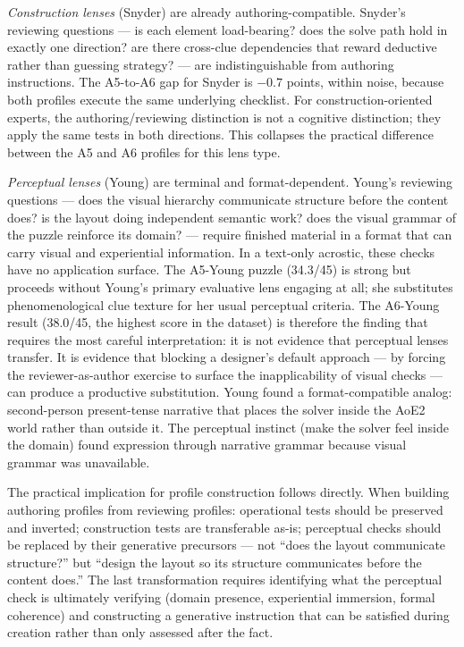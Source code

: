 \textit{Construction lenses} (Snyder) are already authoring-compatible. Snyder's reviewing questions — is each element load-bearing? does the solve path hold in exactly one direction? are there cross-clue dependencies that reward deductive rather than guessing strategy? — are indistinguishable from authoring instructions. The A5-to-A6 gap for Snyder is $-0.7$ points, within noise, because both profiles execute the same underlying checklist. For construction-oriented experts, the authoring/reviewing distinction is not a cognitive distinction; they apply the same tests in both directions. This collapses the practical difference between the A5 and A6 profiles for this lens type.

\textit{Perceptual lenses} (Young) are terminal and format-dependent. Young's reviewing questions — does the visual hierarchy communicate structure before the content does? is the layout doing independent semantic work? does the visual grammar of the puzzle reinforce its domain? — require finished material in a format that can carry visual and experiential information. In a text-only acrostic, these checks have no application surface. The A5-Young puzzle (34.3/45) is strong but proceeds without Young's primary evaluative lens engaging at all; she substitutes phenomenological clue texture for her usual perceptual criteria. The A6-Young result (38.0/45, the highest score in the dataset) is therefore the finding that requires the most careful interpretation: it is not evidence that perceptual lenses transfer. It is evidence that blocking a designer's default approach — by forcing the reviewer-as-author exercise to surface the inapplicability of visual checks — can produce a productive substitution. Young found a format-compatible analog: second-person present-tense narrative that places the solver inside the AoE2 world rather than outside it. The perceptual instinct (make the solver feel inside the domain) found expression through narrative grammar because visual grammar was unavailable.

The practical implication for profile construction follows directly. When building authoring profiles from reviewing profiles: operational tests should be preserved and inverted; construction tests are transferable as-is; perceptual checks should be replaced by their generative precursors — not ``does the layout communicate structure?'' but ``design the layout so its structure communicates before the content does.'' The last transformation requires identifying what the perceptual check is ultimately verifying (domain presence, experiential immersion, formal coherence) and constructing a generative instruction that can be satisfied during creation rather than only assessed after the fact.

